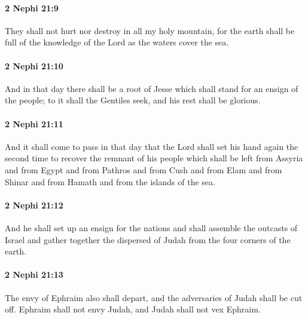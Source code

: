 		\paragraph{2 Nephi 21:9} %
			\label{2NEPHI-21-9}

			They shall not hurt nor destroy in all my holy mountain,
			for the earth shall be full of the knowledge of the Lord
			as the waters cover the sea.

		\paragraph{2 Nephi 21:10} %
			\label{2NEPHI-21-10}

			And in that day there shall be a root of Jesse
			which shall stand for an ensign of the people;
			to it shall the Gentiles seek, and his rest shall be glorious.

		\paragraph{2 Nephi 21:11} %
			\label{2NEPHI-21-11}

			And it shall come to pass in that day
			that the Lord shall set his hand again the second time
			to recover the remnant of his people
			which shall be left from Assyria and from Egypt
			and from Pathros and from Cush and from Elam
			and from Shinar and from Hamath and from the islands of the sea.

		\paragraph{2 Nephi 21:12} %
			\label{2NEPHI-21-12}

			And he shall set up an ensign for the nations
			and shall assemble the outcasts of Israel
			and gather together the dispersed of Judah
			from the four corners of the earth.

		\paragraph{2 Nephi 21:13} %
			\label{2NEPHI-21-13}

			The envy of Ephraim also shall depart,
			and the adversaries of Judah shall be cut off.
			Ephraim shall not envy Judah,
			and Judah shall not vex Ephraim.

